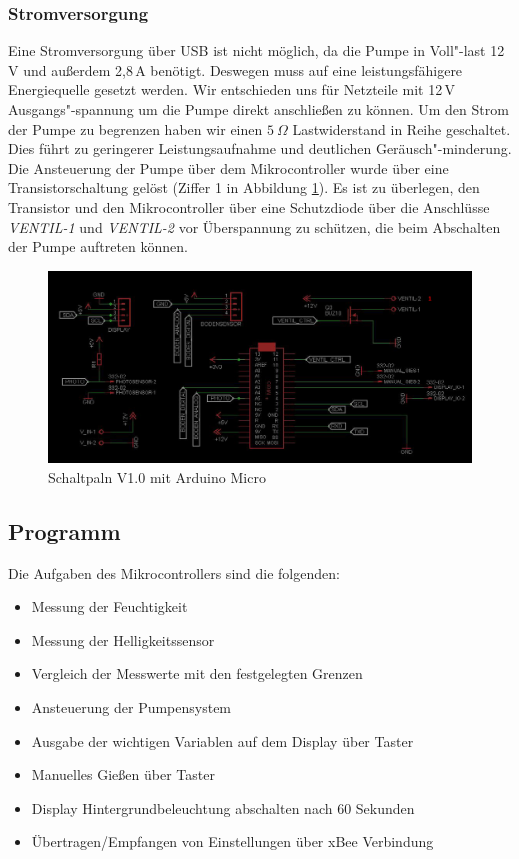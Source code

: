 \documentclass[]{IEEEtran}
\begin{document}
	
\subsubsection{Stromversorgung}

Eine Stromversorgung über USB ist nicht möglich, da die Pumpe in Voll"-last 12\,V und außerdem 2,8\,A benötigt. 
Deswegen muss auf eine leistungsfähigere Energiequelle gesetzt werden.
Wir entschieden uns für Netzteile mit 12\,V Ausgangs"-spannung um die Pumpe direkt anschließen zu können. 
Um den Strom der Pumpe zu begrenzen haben wir einen \begin{math}5~\Omega\end{math} Lastwiderstand in Reihe geschaltet.
Dies führt zu geringerer Leistungsaufnahme und deutlichen Geräusch"-minderung.
Die Ansteuerung der Pumpe über dem Mikrocontroller wurde über eine Transistorschaltung gelöst (Ziffer 1 in Abbildung \ref{fig-Schaltplanv1.0}).
Es ist zu überlegen, den Transistor und den Mikrocontroller über eine Schutzdiode über die Anschlüsse \emph{VENTIL-1} und \emph{VENTIL-2} vor Überspannung zu schützen, die beim Abschalten der Pumpe auftreten können. 
 

\begin{figure}
	\centering
	\includegraphics[width=0.9\linewidth]{bilder/v1SchaltplanMicro0.JPG}
	\caption{Schaltpaln V1.0 mit Arduino Micro}
	\label{fig-Schaltplanv1.0}
\end{figure}

\subsection{Programm}
	

	Die Aufgaben des Mikrocontrollers sind die folgenden:
		\begin{itemize}
			\item Messung der Feuchtigkeit
			\item Messung der Helligkeitssensor
			\item Vergleich der Messwerte mit den festgelegten Grenzen
			\item Ansteuerung der Pumpensystem
			\item Ausgabe der wichtigen Variablen auf dem Display über Taster
			\item Manuelles Gießen über Taster
			\item Display Hintergrundbeleuchtung abschalten nach 60  Sekunden
			\item Übertragen/Empfangen von Einstellungen über xBee Verbindung
		\end{itemize}
		
\end{document}
